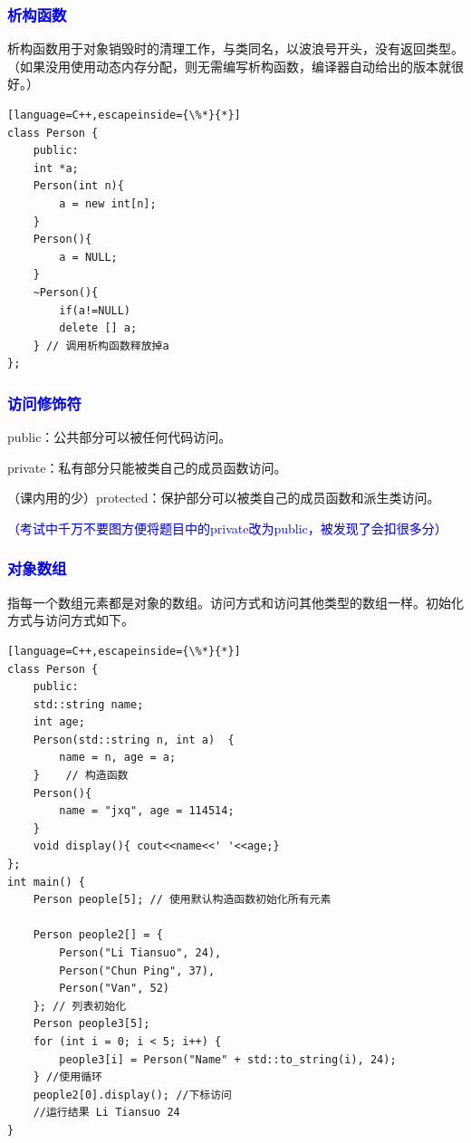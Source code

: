 \documentclass[UTF8]{ctexart}
\begin{document}
\subsubsection{\textcolor{blue}{析构函数}}
析构函数用于对象销毁时的清理工作，与类同名，以波浪号开头，没有返回类型。（如果没用使用动态内存分配，则无需编写析构函数，编译器自动给出的版本就很好。）
\begin{lstlisting}[language=C++,escapeinside={\%*}{*}]
class Person {
	public:
	int *a;
	Person(int n){
		a = new int[n];
	}
	Person(){
		a = NULL;
	}
	~Person(){
		if(a!=NULL)
		delete [] a;
	} // 调用析构函数释放掉a
};
\end{lstlisting}
\subsubsection{\textcolor{blue}{访问修饰符}}
public：公共部分可以被任何代码访问。

private：私有部分只能被类自己的成员函数访问。

（课内用的少）protected：保护部分可以被类自己的成员函数和派生类访问。

\textcolor{blue}{（考试中千万不要图方便将题目中的private改为public，被发现了会扣很多分）}
\subsubsection{\textcolor{blue}{对象数组}}
指每一个数组元素都是对象的数组。访问方式和访问其他类型的数组一样。初始化方式与访问方式如下。
\begin{lstlisting}[language=C++,escapeinside={\%*}{*}]
class Person {
	public:
	std::string name;
	int age;
	Person(std::string n, int a)  {
		name = n, age = a;
	}    // 构造函数
	Person(){
		name = "jxq", age = 114514;
	}
	void display(){ cout<<name<<' '<<age;}
};
int main() {
	Person people[5]; // 使用默认构造函数初始化所有元素
	
	Person people2[] = {
		Person("Li Tiansuo", 24),
		Person("Chun Ping", 37),
		Person("Van", 52)
	}; // 列表初始化
	Person people3[5];
	for (int i = 0; i < 5; i++) {
		people3[i] = Person("Name" + std::to_string(i), 24);
	} //使用循环
	people2[0].display(); //下标访问
	//运行结果 Li Tiansuo 24
}
\end{lstlisting}
\end{document}
